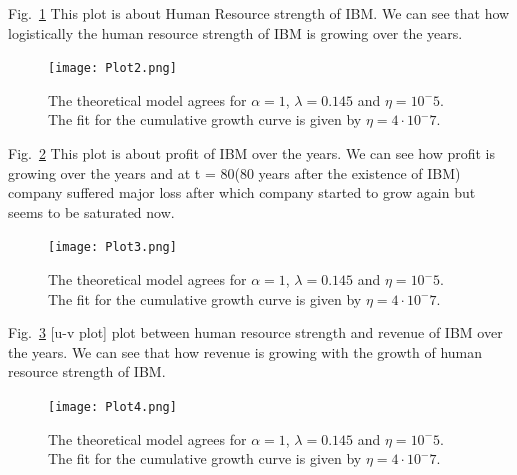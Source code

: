 \documentclass[aps,twocolumn,10pt,reprint]{revtex4}
\begin{document}
Fig.~\ref{Fig:image2f} This plot is about Human Resource strength of IBM. We can see that how logistically the human resource strength of IBM is growing over the years.
\begin{figure}[!h]
\centering
\texttt{[image: Plot2.png]}~
\caption{The theoretical model agrees for $\alpha=1$, $\lambda=0.145$ and $\eta=10^-5$. The fit for the cumulative growth curve is given by $\eta=4 \cdot10^-7$.}\label{Fig:image2f}
\end{figure}

Fig.~\ref{Fig:image3f} This plot is about profit of IBM over the years. We can see how profit is growing over the years and at t = 80(80 years after the existence of IBM) company suffered major loss after which company started to grow again but seems to be saturated now.
\begin{figure}[!h]
\centering
\texttt{[image: Plot3.png]}~
\caption{The theoretical model agrees for $\alpha=1$, $\lambda=0.145$ and $\eta=10^-5$. The fit for the cumulative growth curve is given by $\eta=4 \cdot10^-7$.}\label{Fig:image3f}
\end{figure}

Fig.~\ref{Fig:image4f} [u-v plot] plot between human resource strength and revenue of IBM over the years. We can see that how revenue is growing with the growth of human resource strength of IBM.
\begin{figure}[!h]
\centering
\texttt{[image: Plot4.png]}~
\caption{The theoretical model agrees for $\alpha=1$, $\lambda=0.145$ and $\eta=10^-5$. The fit for the cumulative growth curve is given by $\eta=4 \cdot10^-7$.}\label{Fig:image4f}
\end{figure}



\newpage
\end{document}
